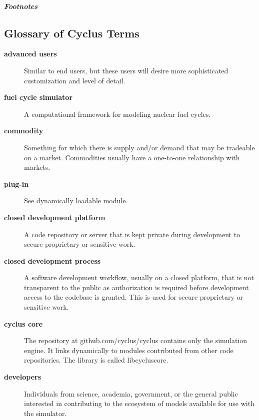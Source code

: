 \documentclass[letterpaper,10pt,english]{sphinxmanual}
\begin{document}
\subparagraph{Footnotes}
\label{basics/ecosystem:footnotes}

\subsection{Glossary of Cyclus Terms}
\label{basics/glossary:glossary-of-cyclus-terms}\label{basics/glossary::doc}\begin{description}
\end{description}
\begin{description}
\item[{\textbf{advanced users}}] \leavevmode
Similar to end users, but these users will desire more
sophisticated customization and level of detail.

\item[{\textbf{fuel cycle simulator}}] \leavevmode
A computational framework for modeling nuclear fuel cycles.

\item[{\textbf{commodity}}] \leavevmode
Something for which there is supply and/or demand that may be tradeable on a
market. Commodities usually have a one-to-one relationship with markets.

\item[{\textbf{plug-in}}] \leavevmode
See dynamically loadable module.

\item[{\textbf{closed development platform}}] \leavevmode
A code repository or server that is kept private during development to
secure proprietary or sensitive work.

\item[{\textbf{closed development process}}] \leavevmode
A software development workflow, usually on a closed platform, that is not
transparent to the public as authorization is required before development
access to the codebase is granted. This is used for secure proprietary or
sensitive work.

\item[{\textbf{cyclus core}}] \leavevmode
The repository at github.com/cyclus/cyclus contains only the simulation
engine. It links dynamically to modules contributed from other code
repositories. The library is called libcycluscore.

\item[{\textbf{developers}}] \leavevmode
Individuals from science, academia, government, or the general public
interested in contributing to the ecosystem of models available for use with
the simulator.


\end{description}
\end{document}
